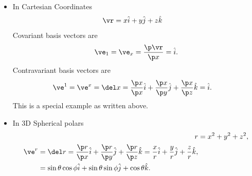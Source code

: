 \documentclass[a4paper, 11pt, normalem]{report}
\begin{document}
\begin{itemize}
    \item In Cartesian Coordinates
        \begin{align}
            \vr &= x\hat{i}+y\hat{j}+z\hat{k}
        \end{align}
        Covariant basis vectors are
        \begin{align}
            \ve_1 = \ve_x = \frac{\p\vr}{\p x} = \hat{i}.
        \end{align}
        Contravariant basis vectors are
        \begin{align}
            \ve^1 = \ve^x &= \del x = \frac{\p x}{\p x}\hat{i} + \frac{\p x}{\p y}\hat{j} + \frac{\p x}{\p z}\hat{k} = \hat{i}.
        \end{align}
        This is a special example as written above.
    \item In 3D Spherical polars
        \begin{align}
            r &= x^2 + y^2 + z^2,\\
            \begin{split}
            \ve^r &= \del r = \frac{\p r}{\p x}\hat{i}+\frac{\p r}{\p y}\hat{j}+\frac{\p r}{\p z}\hat{k} = \frac{x}{r}\hat{i}+\frac{y}{r}\hat{j}+\frac{z}{r}\hat{k},\\
                  &= \sin\theta\cos\phi\hat{i}+\sin\theta\sin\phi\hat{j}+\cos\theta\hat{k}.
            \end{split}
        \end{align}
\end{itemize}
\end{document}
